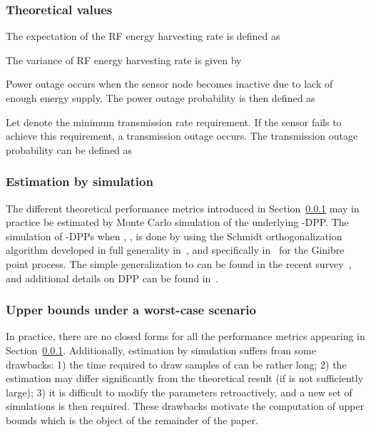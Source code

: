 \documentclass[12pt,draftclsnofoot,onecolumn]{IEEEtran}
\begin{document}
\subsubsection{Theoretical values}
\label{subsec:theoretical}
The expectation of the RF energy harvesting rate is defined as 


The variance of RF energy harvesting rate is given by 




Power outage occurs when the sensor node becomes inactive due to lack of enough energy supply. The power outage probability is then defined as 


Let  denote the minimum transmission rate requirement. If the sensor fails to achieve this requirement, a transmission outage occurs. The transmission outage probability can be defined as 




\subsubsection{Estimation by simulation}

The different theoretical performance metrics introduced in Section~\ref{subsec:theoretical} may in practice be estimated by Monte Carlo simulation of the underlying -DPP. The simulation of -DPPs when , , is done by using the Schmidt orthogonalization algorithm developed in full generality in~\cite{Hough}, and specifically in~\cite{DecreusefondFlintVergne} for the Ginibre point process. The simple generalization to  can be found in the recent survey~\cite{DecreusefondFlintPrivaultTorrisi}, and additional details on DPP can be found in~\cite{DecreusefondFlintPrivaultTorrisi2}. 




\subsubsection{Upper bounds under a worst-case scenario}
\label{subsec:worstcase}

In practice, there are no closed forms for all the performance metrics appearing in Section~\ref{subsec:theoretical}. Additionally, estimation by simulation suffers from some drawbacks: 1) the time required to draw  samples of  can be rather long; 2) the estimation may differ significantly from the theoretical result (if  is not sufficiently large);
3)	it is difficult to modify the parameters retroactively, and a new set of simulations is then required.
These drawbacks motivate the computation of upper bounds which is the object of the remainder of the paper.
\end{document}
